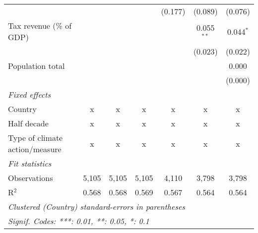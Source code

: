 \begin{tabular}{lcccccc}
                                                             &         &              &                & (0.177)        & (0.089)        & (0.076)\\   
   Tax revenue (\% of GDP)                                   &         &              &                &                & 0.055$^{**}$   & 0.044$^{*}$\\   
                                                             &         &              &                &                & (0.023)        & (0.022)\\   
   Population total                                          &         &              &                &                &                & 0.000\\   
                                                             &         &              &                &                &                & (0.000)\\   
   \emph{Fixed effects}\\
   Country                                                   & x       & x            & x              & x              & x              & x\\  
   Half decade                                               & x       & x            & x              & x              & x              & x\\  
   Type of climate action/measure                            & x       & x            & x              & x              & x              & x\\  
   \midrule \emph{Fit statistics}\\
   Observations                                              & 5,105   & 5,105        & 5,105          & 4,110          & 3,798          & 3,798\\  
   R$^2$                                                     & 0.568   & 0.568        & 0.569          & 0.567          & 0.564          & 0.564\\  
   \midrule
   \multicolumn{7}{l}{\emph{Clustered (Country) standard-errors in parentheses}}\\
   \multicolumn{7}{l}{\emph{Signif. Codes: ***: 0.01, **: 0.05, *: 0.1}}\\
\end{tabular}
\par\endgroup


